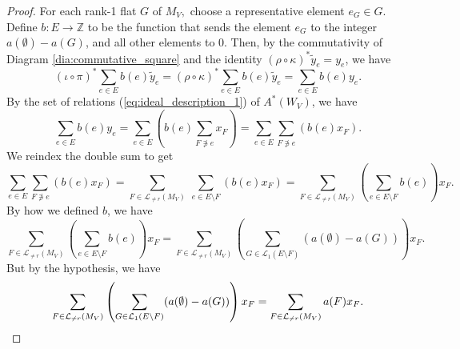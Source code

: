 \documentclass{amsart}
\theoremstyle{plain}
\theoremstyle{definition}
\begin{document}
\begin{proof}
    For each rank-1 flat $G$ of $M_V,$ choose a representative element $e_G \in G.$ Define $b: E \to \mathbb{Z}$ to be the function that sends the element $e_G$ to the integer $a(\emptyset) - a(G)$, and all other elements to 0. Then, by the commutativity of Diagram \ref{dia:commutative_square} and the identity $(\rho \circ \kappa)^* \tilde{y}_e = y_e$, we have
    \begin{equation*}
    \label{eq:line_bundle_construction}
    (\iota \circ \pi)^* \sum_{e \in E} b(e) \tilde{y}_e = (\rho \circ \kappa)^* \sum_{e \in E} b(e) \tilde{y}_e =
    \sum_{e \in E} b(e) y_e. 
    \end{equation*}
    By the set of relations (\ref{eq:ideal_description_1}) of $A^*(W_V)$, we have
    \[\sum_{e \in E} b(e) y_e = \sum_{e\in E} \left( b(e)\sum_{F \not\ni e} x_F \right)=\sum_{e\in E} \sum_{F \not\ni e} \left(b(e) x_F\right).\]
    We reindex the double sum to get
    \[\sum_{e\in E} \sum_{F \not\ni e} \left(b(e) x_F\right) = \sum_{F \in \mathcal{L}_{\neq r}(M_V)} \: \sum_{e \in E \setminus F} (b(e)x_F) = \sum_{F \in \mathcal{L}_{\neq r}(M_V)} \left( \sum_{e \in E \setminus F} b(e) \right) x_F.\]
    By how we defined $b$, we have
    \[\sum_{F \in \mathcal{L}_{\neq r}(M_V)} \left( \sum_{e \in E \setminus F} b(e) \right) x_F = \sum_{F \in \mathcal{L}_{\neq r}(M_V)} \left( \sum_{G \in \mathcal{L}_1(E \setminus F)} (a(\emptyset) - a(G)) \right) x_F.\]
    But by the hypothesis, we have
    \[\sum_{F \in \mathcal{L}_{\neq r}(M_V)} \left( \sum_{G \in \mathcal{L}_1(E \setminus F)} (a(\emptyset) - a(G)) \right) x_F = \sum_{F \in \mathcal{L}_{\neq r}(M_V)} a(F) x_F. \qedhere\]
\end{proof}
\end{document}

